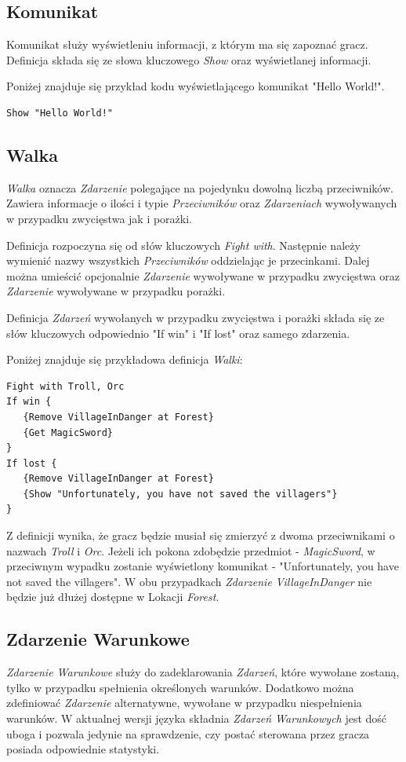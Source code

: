 \documentclass[openright]{xmgr}
\begin{document}
\subsection{Komunikat}
Komunikat służy wyświetleniu informacji, z którym ma się zapoznać gracz. Definicja składa się ze słowa kluczowego \textit{Show} oraz wyświetlanej informacji.

Poniżej znajduje się przykład kodu wyświetlającego komunikat "Hello World!".
\begin{verbatim}
Show "Hello World!"
\end{verbatim}

\subsection{Walka}
\textit{Walka} oznacza \textit{Zdarzenie} polegające na pojedynku dowolną liczbą przeciwników. Zawiera informacje o ilości i typie \textit{Przeciwników} oraz \textit{Zdarzeniach} wywoływanych w przypadku zwycięstwa jak i porażki.

Definicja rozpoczyna się od słów kluczowych \textit{Fight with}. Następnie należy wymienić nazwy wszystkich \textit{Przeciwników} oddzielając je przecinkami. Dalej można umieścić opcjonalnie \textit{Zdarzenie} wywoływane w przypadku zwycięstwa oraz \textit{Zdarzenie} wywoływane w przypadku porażki.

Definicja \textit{Zdarzeń} wywołanych w przypadku zwycięstwa i porażki składa się ze słów kluczowych odpowiednio "If win" i "If lost" oraz samego zdarzenia.

Poniżej znajduje się przykładowa definicja \textit{Walki}:
\begin{verbatim}
Fight with Troll, Orc
If win {
   {Remove VillageInDanger at Forest}
   {Get MagicSword}
}
If lost {
   {Remove VillageInDanger at Forest}
   {Show "Unfortunately, you have not saved the villagers"}
}
\end{verbatim}

Z definicji wynika, że gracz będzie musiał się zmierzyć z dwoma przeciwnikami o nazwach \textit{Troll} i \textit{Orc}. Jeżeli ich pokona zdobędzie przedmiot - \textit{MagicSword}, w przeciwnym wypadku zostanie wyświetlony komunikat - "Unfortunately, you have not saved the villagers". W obu przypadkach \textit{Zdarzenie} \textit{VillageInDanger} nie będzie już dłużej dostępne w Lokacji \textit{Forest}.

\subsection{Zdarzenie Warunkowe}
\textit{Zdarzenie Warunkowe} służy do zadeklarowania \textit{Zdarzeń}, które wywołane zostaną, tylko w przypadku spełnienia określonych warunków. Dodatkowo można zdefiniować \textit{Zdarzenie} alternatywne, wywołane w przypadku niespełnienia warunków. W aktualnej wersji języka składnia \textit{Zdarzeń Warunkowych} jest dość uboga i pozwala jedynie na sprawdzenie, czy postać sterowana przez gracza posiada odpowiednie statystyki.
\end{document}
